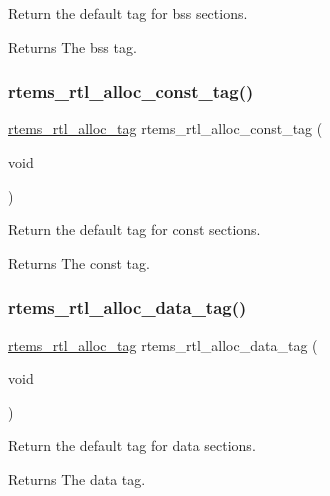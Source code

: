 Return the default tag for bss sections.

\begin{DoxyReturn}{Returns}
The bss tag. 
\end{DoxyReturn}
\mbox{\label{rtl-allocator_8h_ac94530ff626eb651e97d142b635e161e}} 
\subsubsection{\texorpdfstring{rtems\_rtl\_alloc\_const\_tag()}{rtems\_rtl\_alloc\_const\_tag()}}
{\footnotesize\ttfamily \mbox{\hyperlink{rtl-allocator_8h_a445a8615118b7fc14005ab20583153fd}{rtems\+\_\+rtl\+\_\+alloc\+\_\+tag}} rtems\+\_\+rtl\+\_\+alloc\+\_\+const\+\_\+tag (\begin{DoxyParamCaption}\item[{void}]{ }\end{DoxyParamCaption})}

Return the default tag for const sections.

\begin{DoxyReturn}{Returns}
The const tag. 
\end{DoxyReturn}
\mbox{\label{rtl-allocator_8h_aac71a304eb90c1c400a3c5113506219a}} 
\subsubsection{\texorpdfstring{rtems\_rtl\_alloc\_data\_tag()}{rtems\_rtl\_alloc\_data\_tag()}}
{\footnotesize\ttfamily \mbox{\hyperlink{rtl-allocator_8h_a445a8615118b7fc14005ab20583153fd}{rtems\+\_\+rtl\+\_\+alloc\+\_\+tag}} rtems\+\_\+rtl\+\_\+alloc\+\_\+data\+\_\+tag (\begin{DoxyParamCaption}\item[{void}]{ }\end{DoxyParamCaption})}

Return the default tag for data sections.

\begin{DoxyReturn}{Returns}
The data tag. 
\end{DoxyReturn}
\mbox{\label{rtl-allocator_8h_a53995705cd080120f3755af859d7cc50}} 
